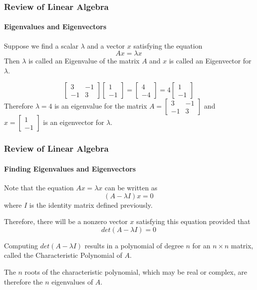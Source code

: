 \begin{frame}
\frametitle{Review of Linear Algebra}
\framesubtitle{Eigenvalues and Eigenvectors}
\begin{definition}
Suppose we find a scalar $\lambda$ and a vector $x$ satisfying the equation
$$
Ax = \lambda x
$$
Then $\lambda$ is called an {\bor Eigenvalue} of the matrix $A$ and $x$ is called
an {\bor Eigenvector} for $\lambda$.
\end{definition}
\begin{examp}
$$
\left[\begin{array}{rr}
3 & -1 \\ -1 & 3
\end{array}\right]
\left[\begin{array}{r}
1 \\ -1
\end{array}\right]
= \left[\begin{array}{r}
4 \\ -4
\end{array}\right]
=
4\left[\begin{array}{r}
1 \\ -1
\end{array}\right]
$$
Therefore $\lambda=4$ is an eigenvalue for the matrix $A = \left[\begin{array}{rr}
3 & -1 \\ -1 & 3
\end{array}\right]$ and $x=\left[\begin{array}{r}
1 \\ -1
\end{array}\right]$ is an eigenvector for $\lambda$.
\end{examp}
\end{frame}
\begin{frame}
\frametitle{Review of Linear Algebra}
\framesubtitle{Finding Eigenvalues and Eigenvectors}
Note that the equation $Ax=\lambda x$ can be written as
$$
(A-\lambda I)x = 0
$$
where $I$ is the {\bor identity matrix} defined previously.

Therefore, there will be a nonzero vector $x$ satisfying this equation provided that
$$
det(A-\lambda I)=0
$$

Computing $det(A-\lambda I)$ results in a polynomial of degree $n$ for an $n\times n$
matrix, called the {\bor Characteristic Polynomial of $A$}.

The $n$ roots of the characteristic polynomial, which may be {\bor real} or {\bor complex},
are therefore the $n$ eigenvalues of $A$.
\end{frame}
